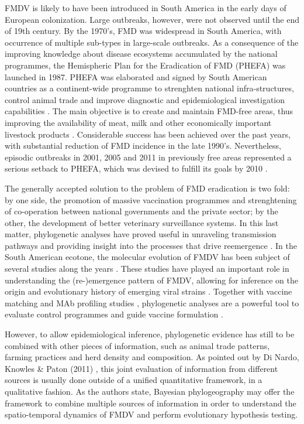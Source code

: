 \documentclass[10pt]{article}
\begin{document}
FMDV is likely to have been introduced in South America in the early days of European colonization.
Large outbreaks, however, were not observed until the end of 19th century.
By the 1970's, FMD was widespread in South America, with occurrence of multiple sub-types \cite{Saraiva2003} in large-scale outbreaks.
As a consequence of the improving knowledge about disease ecosystems accumulated by the national programmes, the Hemispheric Plan for the Eradication of FMD (PHEFA) was launched in 1987. PHEFA was elaborated and signed by South American countries as a continent-wide programme to strenghten national infra-structures, control animal trade and improve diagnostic and epidemiological investigation capabilities \cite{review_eradication}. The main objective is to create and maintain FMD-free areas, thus improving the availability of meat, milk and other economically important livestock products \cite{Saraiva2003,Saraiva2004,review_eradication,combining}. Considerable success has been achieved over the 
past years, with substantial reduction of FMD incidence in the late 1990's. Nevertheless, episodic outbreaks in 2001, 2005 and 2011 in previously free areas represented a serious setback to PHEFA, which was devised to fulfill its goals by 2010 \cite{Saraiva2003,Saraiva2004}.

The generally accepted solution to the problem of FMD eradication is two fold: by one side, the promotion of massive vaccination programmes \cite{vaccinationSA} and strenghtening of co-operation between national governments and the private sector; by the other, the development of better veterinary surveillance systems.
In this last matter, phylogenetic analyses have proved useful in unraveling transmission pathways \cite{cottam2008} and providing insight into the processes that drive reemergence \cite{combining}.
In the South American ecotone, the molecular evolution of FMDV has been subject of several studies along the years \cite{Perez2001,Malirat2007,andean,Malirat2011,Maradei2013}.
These studies have played an important role in understanding the (re-)emergence pattern of FMDV, allowing for inference on the origin and evolutionary history of emerging viral strains \cite{topotypes,Perez2001}. Together with vaccine matching and MAb profiling studies \cite{Maradei2011}, phylogenetic analyses are a powerful 
tool to evaluate control programmes and guide vaccine formulation \cite{Maradei2011,Maradei2013}.

However, to allow epidemiological inference, phylogenetic evidence has still to be combined with other pieces of information, such as animal trade patterns, farming practices and herd density and composition.
As pointed out by Di Nardo, Knowles \&  Paton (2011) \cite{combining}, this joint evaluation of information from different sources is usually done outside of a unified quantitative framework, in a qualitative fashion.
As the authors state, Bayesian phylogeography may offer the framework to combine multiple sources of information in order to understand the spatio-temporal dynamics of FMDV and perform evolutionary hypothesis testing.
\end{document}
